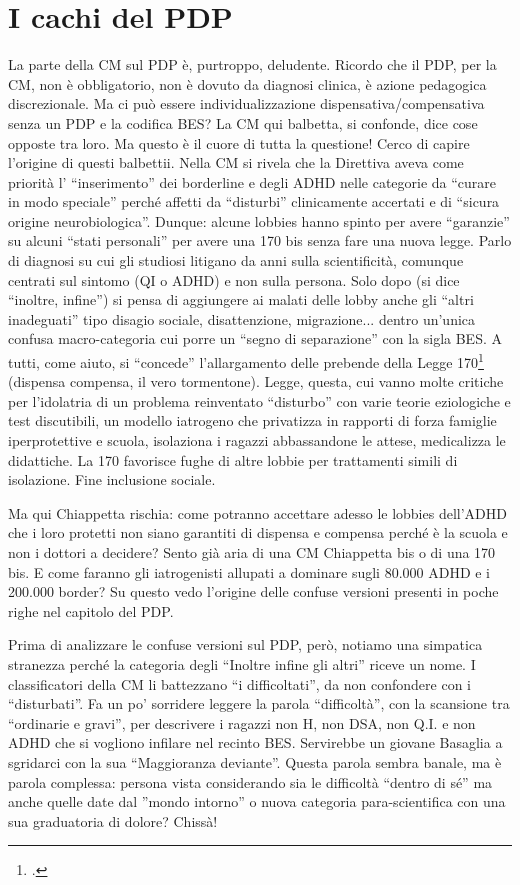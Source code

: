 \section*{I cachi del PDP}
La parte della CM sul PDP è, purtroppo, deludente.  Ricordo che il PDP, per la CM,  non è obbligatorio, non è dovuto da diagnosi clinica, è  azione pedagogica discrezionale. Ma ci può essere individualizzazione  dispensativa/compensativa senza un PDP e la codifica BES? La CM qui balbetta, si confonde, dice cose opposte tra loro. Ma questo è il cuore di tutta la questione!
Cerco di capire l'origine di questi balbettii. Nella CM si  rivela che la Direttiva aveva come priorità  l’ “inserimento” dei borderline e degli ADHD nelle categorie da “curare in modo speciale” perché affetti da “disturbi” clinicamente accertati e di “sicura origine neurobiologica”. Dunque:  alcune lobbies hanno spinto per avere “garanzie” su alcuni “stati personali” per avere una 170 bis senza fare una nuova legge. Parlo di diagnosi su cui gli studiosi litigano da anni sulla scientificità, comunque centrati sul sintomo (QI o ADHD) e non sulla persona. Solo dopo (si dice “inoltre, infine”) si pensa di aggiungere ai malati delle lobby  anche gli “altri inadeguati” tipo disagio sociale, disattenzione, migrazione... dentro un'unica confusa macro-categoria cui porre un “segno di separazione” con la sigla BES. A tutti, come aiuto,  si “concede” l'allargamento delle prebende della Legge 170\footcite{legge170} (dispensa  compensa,  il vero tormentone). Legge, questa,  cui vanno molte critiche per l'idolatria di un problema reinventato “disturbo” con varie teorie eziologiche e test discutibili,  un modello iatrogeno  che privatizza in rapporti di forza famiglie iperprotettive e scuola, isolaziona i ragazzi abbassandone le attese, medicalizza le didattiche. La 170 favorisce  fughe di altre lobbie per trattamenti simili di isolazione. Fine inclusione sociale. 

Ma qui  Chiappetta rischia: come potranno accettare adesso le lobbies dell'ADHD che i loro protetti non siano garantiti di dispensa e compensa perché è la scuola e non i dottori a decidere? Sento già aria di una CM Chiappetta bis o di una 170 bis. E come faranno gli iatrogenisti  allupati a dominare sugli 80.000 ADHD e i 200.000 border? Su questo vedo l'origine delle confuse versioni presenti in poche righe nel capitolo del PDP.

Prima di analizzare le confuse versioni sul PDP, però, notiamo una simpatica stranezza perché la categoria degli “Inoltre infine gli altri” riceve un nome. I classificatori della CM li battezzano “i difficoltati”, da non confondere con i “disturbati”. Fa un po’ sorridere leggere  la parola “difficoltà”, con   la scansione tra “ordinarie e gravi”,  per descrivere i ragazzi non H,  non DSA,  non Q.I. e  non ADHD che si vogliono infilare nel recinto BES. Servirebbe un giovane Basaglia a sgridarci con la sua “Maggioranza deviante”. Questa parola sembra banale, ma è parola complessa: persona vista considerando sia le difficoltà “dentro di sé” ma anche quelle date dal ”mondo intorno” o nuova categoria para-scientifica con una sua graduatoria di dolore?  Chissà!

